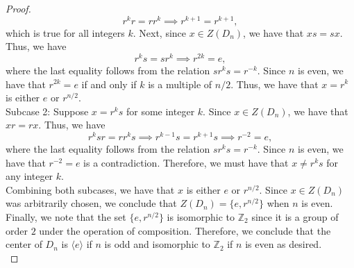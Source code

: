 \documentclass{article}
\def\zz{{\mathbb Z}}
\begin{document}
\begin{proof}
    \[
        r^k r = r r^k \implies r^{k+1} = r^{k+1},
    \]
    which is true for all integers $k$. Next, since $x \in Z(D_n)$, we have that $xs = sx$. Thus, we have
    \[
        r^k s = s r^k \implies r^{2k} = e,
    \]
    where the last equality follows from the relation $s r^k s = r^{-k}$. Since $n$ is even, we have that $r^{2k} = e$ if and only if $k$ is a multiple of $n/2$. Thus, we have that $x = r^k$ is either $e$ or $r^{n/2}$. \\
    Subcase 2: Suppose $x = r^k s$ for some integer $k$. Since $x \in Z(D_n)$, we have that $xr = rx$. Thus, we have
    \[
        r^k s r = r r^k s \implies r^{k-1} s = r^{k+1} s \implies r^{-2} = e,
    \]
    where the last equality follows from the relation $s r^k s = r^{-k}$. Since $n$ is even, we have that $r^{-2} = e$ is a contradiction. Therefore, we must have that $x \neq r^k s$ for any integer $k$. \\
    Combining both subcases, we have that $x$ is either $e$ or $r^{n/2}$. Since $x \in Z(D_n)$ was arbitrarily chosen, we conclude that $Z(D_n) = \{e, r^{n/2}\}$ when $n$ is even. Finally, we note that the set $\{e, r^{n/2}\}$ is isomorphic to $\zz_2$ since it is a group of order $2$ under the operation of composition. Therefore, we conclude that the center of $D_n$ is $\langle e \rangle$ if $n$ is odd and isomorphic to $\zz_2$ if $n$ is even as desired. \\
\end{proof}
\end{document}
